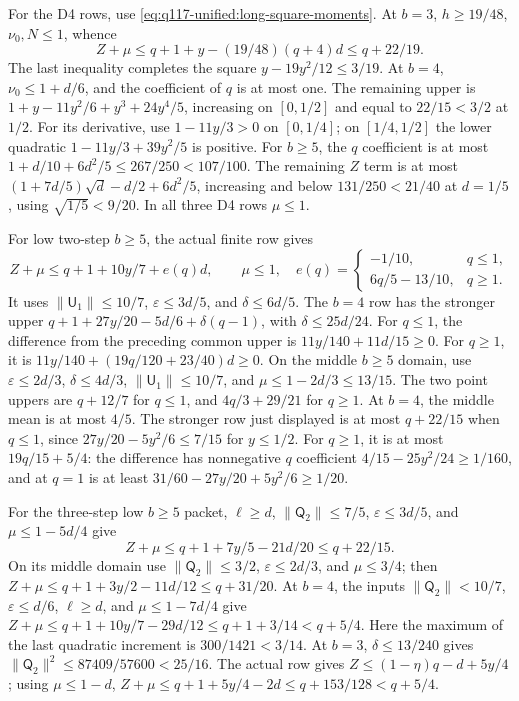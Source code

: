 For the D4 rows, use
\eqref{eq:q117-unified:long-square-moments}.
At \(b=3\), \(h\ge19/48\), \(\nu_0,N\le1\), whence
\[
 Z+\mu\le q+1+y-(19/48)(q+4)d\le q+22/19.
\]
The last inequality completes the square
\(y-19y^2/12\le3/19\).
At \(b=4\), \(\nu_0\le1+d/6\), and the coefficient of
\(q\) is at most one. The remaining upper is
\(1+y-11y^2/6+y^3+24y^4/5\), increasing on \([0,1/2]\)
and equal to \(22/15<3/2\) at \(1/2\).
For its derivative, use \(1-11y/3>0\) on \([0,1/4]\);
on \([1/4,1/2]\) the lower quadratic
\(1-11y/3+39y^2/5\) is positive.
For \(b\ge5\), the \(q\) coefficient is at most
\(1+d/10+6d^2/5\le267/250<107/100\).
The remaining \(Z\) term is at most
\((1+7d/5)\sqrt d-d/2+6d^2/5\), increasing and below
\(131/250<21/40\) at \(d=1/5\), using \(\sqrt{1/5}<9/20\).
In all three D4 rows \(\mu\le1\).

For low two-step \(b\ge5\), the actual finite row gives
\[
 Z+\mu\le q+1+10y/7+e(q)d,\qquad\mu\le1,
 \quad e(q)=\begin{cases}-1/10,&q\le1,\\6q/5-13/10,&q\ge1.
                         \end{cases}
\]
It uses \(\|\mathsf U_1\|\le10/7\),
\(\varepsilon\le3d/5\), and \(\delta\le6d/5\).
The \(b=4\) row has the stronger upper
\(q+1+27y/20-5d/6+\delta(q-1)\), with
\(\delta\le25d/24\). For \(q\le1\), the difference from
the preceding common upper is \(11y/140+11d/15\ge0\).
For \(q\ge1\), it is
\(11y/140+(19q/120+23/40)d\ge0\).
On the middle \(b\ge5\) domain, use
\(\varepsilon\le2d/3\), \(\delta\le4d/3\),
\(\|\mathsf U_1\|\le10/7\), and
\(\mu\le1-2d/3\le13/15\).
The two point uppers are \(q+12/7\) for \(q\le1\), and
\(4q/3+29/21\) for \(q\ge1\).
At \(b=4\), the middle mean is at most \(4/5\).
The stronger row just displayed is at most \(q+22/15\) when
\(q\le1\), since \(27y/20-5y^2/6\le7/15\) for
\(y\le1/2\). For \(q\ge1\), it is at most
\(19q/15+5/4\): the difference has nonnegative \(q\) coefficient
\(4/15-25y^2/24\ge1/160\), and at \(q=1\) is at least
\(31/60-27y/20+5y^2/6\ge1/20\).

For the three-step low \(b\ge5\) packet,
\(\ell\ge d\), \(\|\mathsf Q_2\|\le7/5\),
\(\varepsilon\le3d/5\), and \(\mu\le1-5d/4\) give
\[
 Z+\mu\le q+1+7y/5-21d/20\le q+22/15.
\]
On its middle domain use \(\|\mathsf Q_2\|\le3/2\),
\(\varepsilon\le2d/3\), and \(\mu\le3/4\); then
\(Z+\mu\le q+1+3y/2-11d/12\le q+31/20\).
At \(b=4\), the inputs \(\|\mathsf Q_2\|<10/7\),
\(\varepsilon\le d/6\), \(\ell\ge d\), and
\(\mu\le1-7d/4\) give
\(Z+\mu\le q+1+10y/7-29d/12\le q+1+3/14<q+5/4\).
Here the maximum of the last quadratic increment is
\(300/1421<3/14\).
At \(b=3\), \(\delta\le13/240\) gives
\(\|\mathsf Q_2\|^2\le87409/57600<25/16\).
The actual row gives \(Z\le(1-\eta)q-d+5y/4\);
using \(\mu\le1-d\),
\(Z+\mu\le q+1+5y/4-2d\le q+153/128<q+5/4\).


